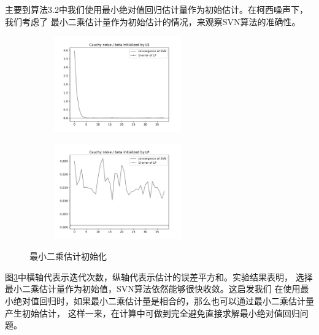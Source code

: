 主要到算法3.2中我们使用最小绝对值回归估计量作为初始估计。在柯西噪声下，我们考虑了
最小二乘估计量作为初始估计的情况，来观察SVN算法的准确性。

\begin{figure}[H]
    \centering
    \begin{subfigure}[t]{0.3\textwidth}\label{svn-demo2}
    \includegraphics[width=5.5cm]{pics/chapter2/l2-svn-demo.pdf}
    \end{subfigure}
    \begin{subfigure}[t]{0.3\textwidth}\label{svn-demo3}
    \includegraphics[width=5.5cm]{pics/chapter2/l1-svn-demo.pdf}
    \end{subfigure}
    \caption{ \small 最小二乘估计初始化}
    \label{svn-l2-demo}
\end{figure}

图\ref{svn-l2-demo}中横轴代表示迭代次数，纵轴代表示估计的误差平方和。实验结果表明，
选择最小二乘估计量作为初始值，SVN算法依然能够很快收敛。这启发我们
在使用最小绝对值回归时，如果最小二乘估计量是相合的，那么也可以通过最小二乘估计量产生初始估计，
这样一来，在计算中可做到完全避免直接求解最小绝对值回归问题。

